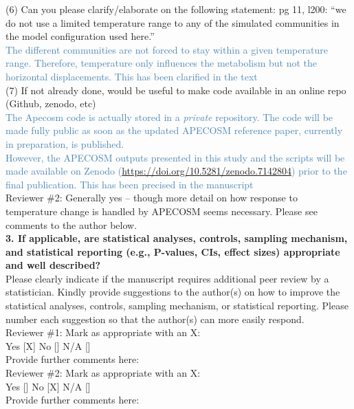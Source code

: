\documentclass[12pt]{article}
\newcommand{\resp}[1]{\textcolor{SteelBlue}{#1}}
\begin{document}
(6) Can you please clarify/elaborate on the following statement: pg 11, l200: “we do not use a limited temperature range to any of the simulated communities in the model configuration used here.” \\

\resp{The different communities are not forced to stay within a given temperature range. Therefore, temperature
only influences the metabolism but not the horizontal displacements. This has been clarified in the text} \\

(7) If not already done, would be useful to make code available in an online repo (Github, zenodo, etc) \\ 

\resp{The Apecosm code is actually stored in a \emph{private} repository. The code will be made fully public as soon as the updated APECOSM reference paper, currently in preparation, is published.} \\

\resp{However, the APECOSM outputs presented in this study and the scripts will be made available on Zenodo (\url{https://doi.org/10.5281/zenodo.7142804}) prior to the final publication. This has been precised in the manuscript} \\

Reviewer \#2: Generally yes -- though more detail on how response to temperature change is handled by APECOSM seems necessary. Please see comments to the author below. \\

\textbf{3. If applicable, are statistical analyses, controls, sampling mechanism, and statistical reporting (e.g., P-values, CIs, effect sizes) appropriate and well described?} \\

Please clearly indicate if the manuscript requires additional peer review by a statistician. Kindly provide suggestions to the author(s) on how to improve the statistical analyses, controls, sampling mechanism, or statistical reporting. Please number each suggestion so that the author(s) can more easily respond.\\

Reviewer \#1: Mark as appropriate with an X:\\
Yes [X] No [] N/A []\\
Provide further comments here:\\

Reviewer \#2: Mark as appropriate with an X:\\
Yes [] No [X] N/A []\\
Provide further comments here:\\
\end{document}
